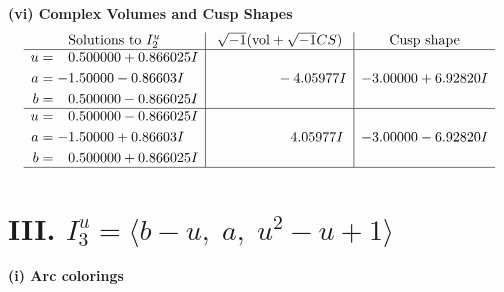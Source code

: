 \documentclass[1p]{elsarticle_modified}
\theoremstyle{definition}
\newcommand{\I}{\sqrt{-1}}
\begin{document}
\newpage\flushleft \textbf{(vi) Complex Volumes and Cusp Shapes}
$$\begin{array}{c|c|c}  
\text{Solutions to }I^u_{2}& \I (\text{vol} + \sqrt{-1}CS) & \text{Cusp shape}\\
 \hline 
\begin{aligned}
u &= \phantom{-}0.500000 + 0.866025 I \\
a &= -1.50000 - 0.86603 I \\
b &= \phantom{-}0.500000 - 0.866025 I\end{aligned}
 & \phantom{-0.000000 } -4.05977 I & -3.00000 + 6.92820 I \\ \hline\begin{aligned}
u &= \phantom{-}0.500000 - 0.866025 I \\
a &= -1.50000 + 0.86603 I \\
b &= \phantom{-}0.500000 + 0.866025 I\end{aligned}
 & \phantom{-0.000000 -}4.05977 I & -3.00000 - 6.92820 I\\
 \hline 
 \end{array}$$\newpage\newpage\renewcommand{\arraystretch}{1}
\centering \section*{III. $I^u_{3}= \langle b- u,\;a,\;u^2- u+1 \rangle$}
\flushleft \textbf{(i) Arc colorings}\\
\end{document}
